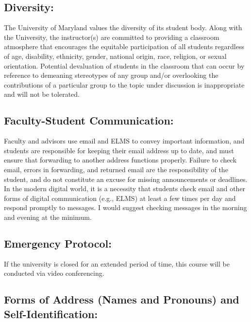 \documentclass[
]{book}
\begin{document}
\hypertarget{diversity}{%
\subsection{Diversity:}\label{diversity}}

The University of Maryland values the diversity of its student body. Along with the University, the instructor(s) are committed to providing a classroom atmosphere that encourages the equitable participation of all students regardless of age, disability, ethnicity, gender, national origin, race, religion, or sexual orientation. Potential devaluation of students in the classroom that can occur by reference to demeaning stereotypes of any group and/or overlooking the contributions of a particular group to the topic under discussion is inappropriate and will not be tolerated.

\hypertarget{faculty-student-communication-1}{%
\subsection{Faculty-Student Communication:}\label{faculty-student-communication-1}}

Faculty and advisors use email and ELMS to convey important information, and students are responsible for keeping their email address up to date, and must ensure that forwarding to another address functions properly. Failure to check email, errors in forwarding, and returned email are the responsibility of the student, and do not constitute an excuse for missing announcements or deadlines. In the modern digital world, it is a necessity that students check email and other forms of digital communication (e.g., ELMS) at least a few times per day and respond promptly to messages. I would suggest checking messages in the morning and evening at the minimum.

\hypertarget{emergency-protocol-1}{%
\subsection{Emergency Protocol:}\label{emergency-protocol-1}}

If the university is closed for an extended period of time, this course will be conducted via video conferencing.

\hypertarget{forms-of-address-names-and-pronouns-and-self-identification}{%
\subsection{Forms of Address (Names and Pronouns) and Self-Identification:}\label{forms-of-address-names-and-pronouns-and-self-identification}}
\end{document}
